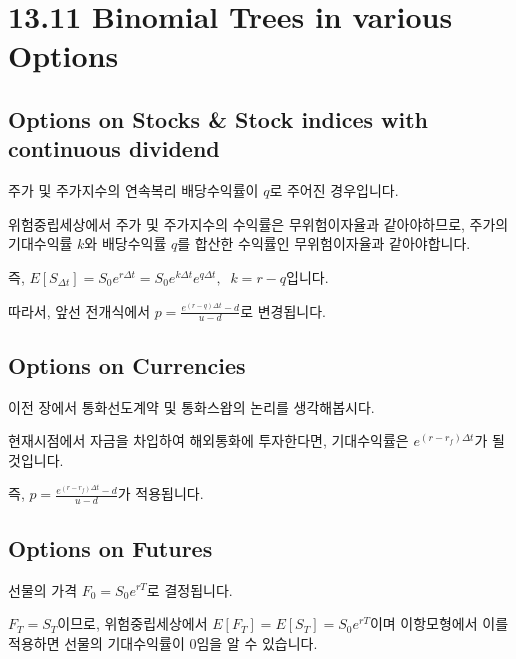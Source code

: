 \documentclass[
  letterpaper,
  DIV=11,
  numbers=noendperiod]{scrreprt}
\begin{document}
\section*{13.11 Binomial Trees in various
Options}\label{binomial-trees-in-various-options}


\subsection*{Options on Stocks \& Stock indices with continuous
dividend}\label{options-on-stocks-stock-indices-with-continuous-dividend}

주가 및 주가지수의 연속복리 배당수익률이 \(q\)로 주어진 경우입니다.

위험중립세상에서 주가 및 주가지수의 수익률은 무위험이자율과
같아야하므로, 주가의 기대수익률 \(k\)와 배당수익률 \(q\)를 합산한
수익률인 무위험이자율과 같아야합니다.

즉,
\(E[S_{\Delta t}]=S_0e^{r\Delta t}=S_0e^{k\Delta t}e^{q\Delta t},\;\;k=r-q\)입니다.

따라서, 앞선 전개식에서 \(p=\frac{e^{(r-q)\Delta t}-d}{u-d}\)로
변경됩니다.

\subsection*{Options on Currencies}\label{options-on-currencies}

이전 장에서 통화선도계약 및 통화스왑의 논리를 생각해봅시다.

현재시점에서 자금을 차입하여 해외통화에 투자한다면, 기대수익률은
\(e^{(r-r_f)\Delta t}\)가 될 것입니다.

즉, \(p=\frac{e^{(r-r_f)\Delta t}-d}{u-d}\)가 적용됩니다.

\subsection*{Options on Futures}\label{options-on-futures}

선물의 가격 \(F_0=S_0e^{rT}\)로 결정됩니다.

\(F_T=S_T\)이므로, 위험중립세상에서 \(E[F_T]=E[S_T]=S_0e^{rT}\)이며
이항모형에서 이를 적용하면 선물의 기대수익률이 0임을 알 수 있습니다.
\end{document}
